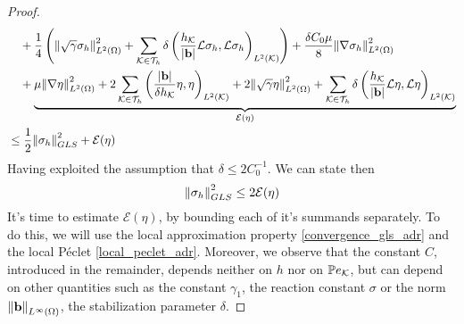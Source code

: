 \begin{proof}
\begin{align*}
        &\quad + \frac{1}{4} \left( \norm{\sqrt{\gamma}\sigma_h}_{L^2(\Omega)}^2 + \sum_{\mathcal{K}\in\mathcal{T}_h} \delta \left( \frac{h_{\mathcal{K}}}{\abs{\textbf{b}}} \mathcal{L}\sigma_h,\mathcal{L} \sigma_h \right)_{L^2(\mathcal{K})} \right) + \frac{\delta C_0 \mu}{8} \norm{\nabla \sigma_h}_{L^2(\Omega)}^2 \\
        &\quad + \underbrace{\mu\norm{\nabla \eta}_{L^2(\Omega)}^2 + 2 \sum_{\mathcal{K}\in\mathcal{T}_h} \left( \frac{\abs{\textbf{b}}}{\delta h_{\mathcal{K}}} \eta, \eta \right)_{L^2(\mathcal{K})} + 2 \norm{\sqrt{\gamma}\eta}_{L^2(\Omega)}^2 + \sum_{\mathcal{K}\in\mathcal{T}_h} \delta \left( \frac{h_{\mathcal{K}}}{\abs{\textbf{b}}} \mathcal{L}\eta, \mathcal{L}\eta \right)_{L^2(\mathcal{K})}}_{\mathcal{E}(\eta)} \\
        &\leq \frac{1}{2} \norm{\sigma_h}_{GLS}^2 + \mathcal{E}(\eta)
    \end{align*}
    Having exploited the assumption that \(\delta \leq 2C^{-1}_0\). We can state then
    \[
        \norm{\sigma_h}_{GLS}^2 \leq 2\mathcal{E}(\eta)
    \]
    It's time to estimate \(\mathcal{E}(\eta)\), by bounding each of it's summands separately. To do this, we will use the local approximation property \eqref{convergence_gls_adr} and the local Péclet \eqref{local_peclet_adr}. Moreover, we observe that the constant \(C\), introduced in the remainder, depends neither on \(h\) nor on \(\mathbb{P}e_{\mathcal{K}}\), but can depend on other quantities such as the constant \(\gamma_1\), the reaction constant \(\sigma\) or the norm \(\norm{\textbf{b}}_{L^\infty(\Omega)}\), the stabilization parameter \(\delta\).


\end{proof}
